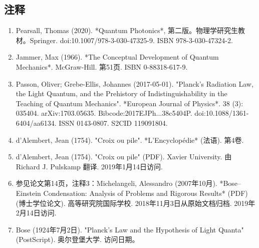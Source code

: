 \subsection{注释}
\begin{enumerate}
\item Pearsall, Thomas (2020). *Quantum Photonics*, 第二版。物理学研究生教材。Springer. doi:10.1007/978-3-030-47325-9. ISBN 978-3-030-47324-2.
\item Jammer, Max (1966). *The Conceptual Development of Quantum Mechanics*. McGraw-Hill. 第51页. ISBN 0-88318-617-9.
\item Passon, Oliver; Grebe-Ellis, Johannes (2017-05-01). "Planck's Radiation Law, the Light Quantum, and the Prehistory of Indistinguishability in the Teaching of Quantum Mechanics". *European Journal of Physics*. 38 (3): 035404. arXiv:1703.05635. Bibcode:2017EJPh...38c5404P. doi:10.1088/1361-6404/aa6134. ISSN 0143-0807. S2CID 119091804.
\item d'Alembert, Jean (1754). "Croix ou pile". *L'Encyclopédie* (法语). 第4卷.
\item d'Alembert, Jean (1754). "Croix ou pile" (PDF). Xavier University. 由 Richard J. Pulskamp 翻译. 2019年1月14日访问.
\item 参见论文第14页，注释3：Michelangeli, Alessandro (2007年10月). *Bose–Einstein Condensation: Analysis of Problems and Rigorous Results* (PDF) (博士学位论文). 高等研究院国际学校. 2018年11月3日从原始文档归档. 2019年2月14日访问.
\item Bose (1924年7月2日). "Planck's Law and the Hypothesis of Light Quanta" (PostScript). 奥尔登堡大学. 访问日期。
\end{enumerate}